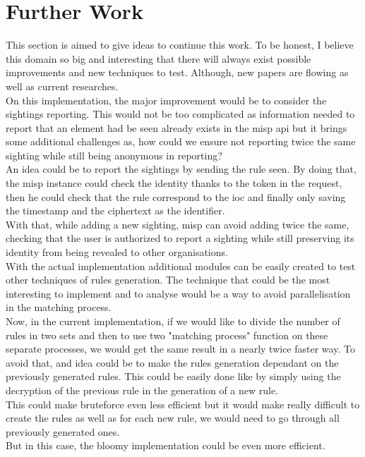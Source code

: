 \documentclass{eplmastersthesis}
\begin{document}
\section{Further Work}
This section is aimed to give ideas to continue this work. To be honest, I believe this domain so big and interesting that there will always exist possible improvements and new techniques to test. Although, new papers are flowing as well as current researches.\\
On this implementation, the major improvement would be to consider the sightings reporting. This would not be too complicated as information needed to report that an element had be seen already exists in the \gls{misp} \gls{api} but it brings some additional challenges as, how could we ensure not reporting twice the same sighting while still being anonymous in reporting?\\
An idea could be to report the sightings by sending the rule seen. By doing that, the \gls{misp} instance could check the identity thanks to the token in the request, then he could check that the rule correspond to the \gls{ioc} and finally only saving the timestamp and the ciphertext as the identifier.\\
With that, while adding a new sighting, \gls{misp} can avoid adding twice the same, checking that the user is authorized to report a sighting while still preserving its identity from being revealed to other organisations.\\

With the actual implementation additional modules can be easily created to test other techniques of rules generation. The technique that could be the most interesting to implement and to analyse would be a way to avoid parallelisation in the matching process. \\
Now, in the current implementation, if we would like to divide the number of rules in two sets and then to use two "matching process" function on these separate processes, we would get the same result in a nearly twice faster way. To avoid that, and idea could be to make the rules generation dependant on the previously generated rules. This could be easily done like by simply using the decryption of the previous rule in the generation of a new rule.\\
This could make bruteforce even less efficient but it would make really difficult to create the rules as well as for each new rule, we would need to go through all previously generated ones.\\
But in this case, the bloomy implementation could be even more efficient.\\
\end{document}
